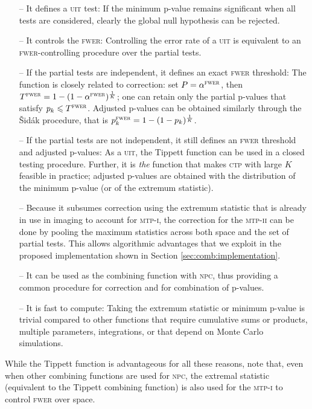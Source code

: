 \begin{itemize}
\item[--] It defines a \textsc{uit} test: If the minimum p-value remains significant when all tests are considered, clearly the global null hypothesis can be rejected.
\item[--] It controls the \textsc{fwer}: Controlling the error rate of a \textsc{uit} is equivalent to an \textsc{fwer}-controlling procedure over the partial tests.
\item[--] If the partial tests are independent, it defines an exact \textsc{fwer} threshold: The function is closely related to \citet{Sidak1967} correction: set $P=\alpha^{\text{\textsc{fwer}}}$, then $T^{\text{\textsc{fwer}}}=1-(1-\alpha^{\text{\textsc{fwer}}})^{\frac{1}{K}}$; one can retain only the partial p-values that satisfy $p_k \leqslant T^{\text{\textsc{fwer}}}$. Adjusted p-values can be obtained similarly through the \v{S}id\'{a}k procedure, that is $p_k^\textsc{fwer}=1-(1-p_k)^{\frac{1}{K}}$.
\item[--] If the partial tests are not independent, it still defines an \textsc{fwer} threshold and adjusted p-values: As a \textsc{uit}, the Tippett function can be used in a closed testing procedure. Further, it is \emph{the} function that makes \textsc{ctp} with large $K$ feasible in practice; adjusted p-values are obtained with the distribution of the minimum p-value (or of the extremum statistic).
\item[--] Because it subsumes correction using the extremum statistic that is already in use in imaging to account for \textsc{mtp-i}, the correction for the \textsc{mtp-ii} can be done by pooling the maximum statistics across both space and the set of partial tests. This allows algorithmic advantages that we exploit in the proposed implementation shown in Section \ref{sec:comb:implementation}.
\item[--] It can be used as the combining function with \textsc{npc}, thus providing a common procedure for correction and for combination of p-values.
\item[--] It is fast to compute: Taking the extremum statistic or minimum p-value is trivial compared to other functions that require cumulative sums or products, multiple parameters, integrations, or that depend on Monte Carlo simulations.
\end{itemize}

While the Tippett function is advantageous for all these reasons, note that, even when other combining functions are used for \textsc{npc}, the extremal statistic (equivalent to the Tippett combining function) is also used for the \textsc{mtp-i} to control \textsc{fwer} over space.

